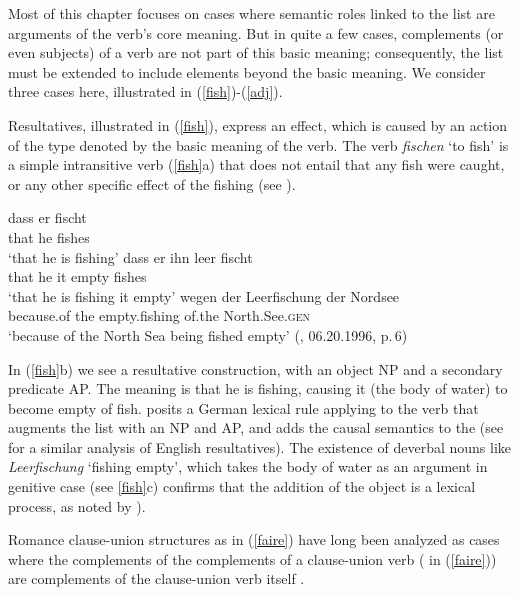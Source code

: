 \documentclass[output=paper
                ,modfonts
                ,nonflat
	        ,collection
	        ,collectionchapter
	        ,collectiontoclongg
 	        ,biblatex
                ,babelshorthands
                ,newtxmath
                ,draftmode
                ,colorlinks, citecolor=brown
]{./langsci/langscibook}
\begin{document}
Most of this chapter focuses on cases where semantic roles linked to the \argst list are arguments of the verb's core meaning. But in quite a few cases, complements (or even subjects) of a verb are not part of this basic meaning; consequently, the \argst list must be extended to include elements beyond the basic meaning. We consider three cases here, illustrated in (\ref{fish})-(\ref{adj}).  

Resultatives,  illustrated in (\ref{fish}), express an effect, which is caused by an action of the type denoted by the basic meaning of the verb. The verb \textit{fischen} `to fish' is a simple intransitive verb (\ref{fish}a) that does not entail that any fish were caught, or any other specific effect of the fishing (see \citealt[219--220]{Mueller2002b}).  

\begin{exe}
\ex\label{fish}
\begin{xlist}
\ex
\gll dass er  fischt\\
     that he  fishes\\
\glt `that he is fishing'
\ex 
\gll dass er ihn leer fischt\\
     that he it empty fishes\\
\glt `that he is fishing it empty'
\ex 
\gll wegen der Leerfischung der Nordsee \\
     because.of the empty.fishing of.the North.See.\textsc{gen} \\
\glt `because of the North Sea being fished empty' (, 06.20.1996, p.\,6)
\end{xlist}
\end{exe}

\noindent
 In (\ref{fish}b) we see a resultative construction, with an object NP and a secondary predicate AP.  The meaning is that he is fishing, causing it (the body of water) to become empty of fish.  \citet[241]{Mueller2002b} posits a German lexical rule applying to the verb that augments the \argst list with an NP and AP, and adds the causal semantics to the \content (see \cite{Wechsler2005result} for a similar analysis of English resultatives).     The existence of deverbal nouns like \textit{Leerfischung} `fishing empty', which takes the body of water as an argument in genitive case (see \ref{fish}c) confirms that the addition of the object is a lexical process, as noted by \citealt{Mueller2002b}).  

Romance clause-union structures as in (\ref{faire}) have long been analyzed as cases where the complements of the complements of a clause-union verb ( in (\ref{faire})) are complements of the clause-union verb itself \citep{Aissen1979}.
\end{document}
